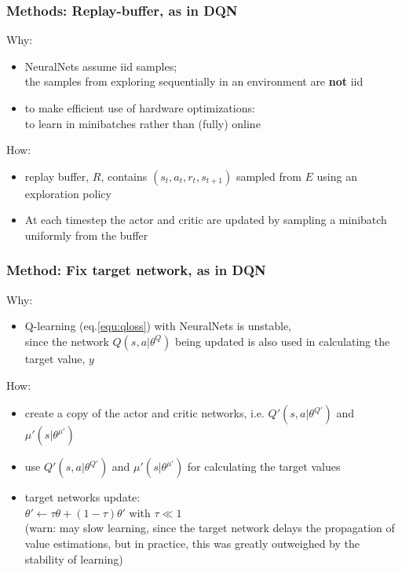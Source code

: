 \begin{frame}
\frametitle{Methods: Replay-buffer, as in DQN~\cite{Mnih2013}}
Why:
\begin{itemize}
\item NeuralNets assume iid samples;\\
the samples from exploring sequentially in an environment are \textbf{not} iid
\item to make efficient use of hardware optimizations:\\
to learn in minibatches rather than (fully) online
\end{itemize}
\vspace{5mm}

How:
\begin{itemize}
  \item replay buffer, $R$, contains $(s_t, a_t, r_t, s_{t+1})$ sampled from $E$ using an exploration policy
  \item At each timestep the actor and critic are updated by sampling a minibatch uniformly from the buffer
\end{itemize}

\end{frame}

\begin{frame}
\frametitle{Method: Fix target network, as in DQN~\cite{Mnih2013}}
Why:
\begin{itemize}
\item Q-learning (eq.\ref{equ:qloss}) with NeuralNets is unstable, \\
since the network $Q(s, a|\theta^Q)$ being updated is also used in
calculating the target value, $y$
\end{itemize}
\vspace{5mm}

How:
\begin{itemize}
\item {\footnotesize create a copy of the actor and critic networks, i.e.}
  $Q'(s, a|\theta^{Q'})$ and $\mu'(s|\theta^{\mu'})$
\item use $Q'(s, a|\theta^{Q'})$ and $\mu'(s|\theta^{\mu'})$ for calculating the target values
\item target networks update: \\
    $\theta' \leftarrow \tau \theta + (1 - \tau) \theta'$ with $\tau \ll 1$\\
    (warn: may slow learning, since the target network delays the propagation of value estimations, but
    in practice, this was greatly outweighed by the stability of learning)
\end{itemize}

\end{frame}


